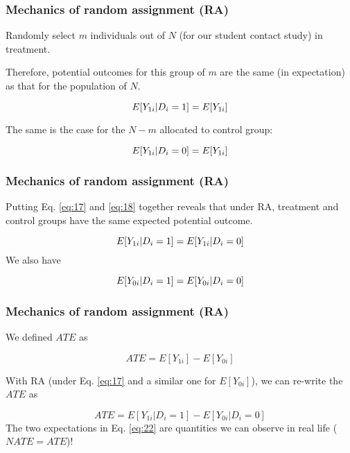 \documentclass[12pt,english,dvipsnames,aspectratio=169,handout]{beamer}\usepackage[]{graphicx}\usepackage[]{xcolor}
\begin{document}
\begin{frame}
  \frametitle{Mechanics of random assignment (RA)}
  
  Randomly select $m$ individuals out of $N$ (for our student contact study) in treatment.\bigskip
  
  Therefore, potential outcomes for this group of $m$ are the same (in expectation) as that for the population of $N$.
  
  \begin{equation}
  \footnotesize
  E[Y_{1i}|D_i=1] = E[Y_{1i}]
    \label{eq:17}
  \end{equation}
  \pause
  
  The same is the case for the $N-m$ allocated to control group:
  
  \begin{equation}
  \footnotesize
  E[Y_{1i}|D_i=0] = E[Y_{1i}]
    \label{eq:18}
  \end{equation}
  
\end{frame}

\begin{frame}
  \frametitle{Mechanics of random assignment (RA)}
  
  Putting Eq. \ref{eq:17} and \ref{eq:18} together reveals that under RA, treatment and control groups have the same expected potential outcome.
  
  \begin{equation}
  \footnotesize
  E[Y_{1i}|D_i=1] = E[Y_{1i}|D_i=0]
    \label{eq:19}
  \end{equation}
  \pause
  We also have
  
  \begin{equation}
  \footnotesize
  E[Y_{0i}|D_i=1] = E[Y_{0i}|D_i=0]
    \label{eq:20}
  \end{equation}
  
\end{frame}


\begin{frame}
  \frametitle{Mechanics of random assignment (RA)}
  
  We defined $ATE$ as
  
  \begin{equation}
  ATE = E[Y_{1i}] - E[Y_{0i}]
    \label{eq:21}
  \end{equation}
  
  With RA (under Eq. \ref{eq:17} and a similar one for $E[Y_{0i}]$), we can re-write the $ATE$ as
  
  \begin{equation}
  ATE = E[Y_{1i}|D_i=1] - E[Y_{0i}|D_i=0]
    \label{eq:22}
  \end{equation}
  \pause
  The two expectations in Eq. \ref{eq:22} are quantities we can observe in real life ($NATE=ATE$)!
  
\end{frame}
\end{document}
